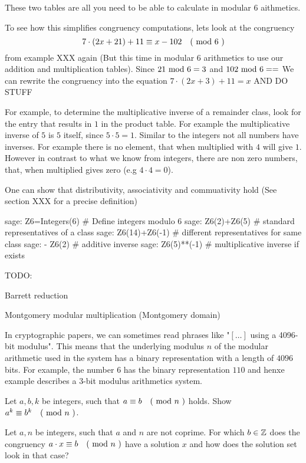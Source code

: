 \begin{example} 
These two tables are all you need to be able to calculate in modular $6$ aithmetics. 

To see how this simplifies congruency computations, lets look at the congruency 
$$7\cdot(2x+21) + 11 \equiv x-102 \quad \text{( mod } 6 \text{ )}$$
from example XXX again (But this time in modular $6$ arithmetics to use our addition and multiplication tables). Since $21 \text{ mod } 6= 3$ and $102 \text{ mod } 6= =$ We can rewrite the congruency into the equation 
$7\cdot(2x+3) + 11=x$
AND DO STUFF



For example, to determine the multiplicative inverse of a remainder class, look for the entry that results in $ 1 $ in the product table. For example the multiplicative inverse of $ 5 $ is $ 5 $ itself, since $5\cdot 5 = 1$. Similar to the integers not all numbers have inverses. For example there is no element, that when multiplied with $4$ will give $1$. 
However in contrast to what we know from integers, there are non zero numbers, that, when multiplied gives zero (e.g $4\cdot 4 =0$).

One can show that distributivity, associativity and commuativity hold (See section XXX for a precise definition)

\begin{sagecommandline}
sage: Z6=Integers(6) # Define integers modulo 6 
sage: Z6(2)+Z6(5) # standard representatives of a class
sage: Z6(14)+Z6(-1) # different representatives for same class
sage: - Z6(2) # additive inverse
sage: Z6(5)**(-1) # multiplicative inverse if exists
\end{sagecommandline}
\end{example}

TODO:

Barrett reduction

Montgomery modular multiplication (Montgomery domain)

\begin{jargon} In cryptographic papers, we can sometimes read phrases like "$[\ldots]$ using a 4096-bit modulus". This means that the underlying modulus $n$ of the modular arithmetic used in the system has a binary representation with a length of $4096$ bits. For example, the number $6$ has the binary representation $110$ and henxe example describes a $3$-bit modulus arithmetics system.   
\end{jargon}
\begin{exercise}
Let $a,b,k$ be integers, such that $a \equiv b \quad \text{( mod } n \text{ )}$ holds. Show $a^k \equiv b^k \quad \text{( mod } n \text{ )}$.
\end{exercise}
\begin{exercise}
Let $a,n$ be integers, such that $a$ and $n$ are not coprime. For which $b\in\mathbb{Z}$ does the 
congruency $a\cdot x \equiv b \quad \text{( mod } n \text{ )}$ have a solution $x$ and how does the solution set look in that case?
\end{exercise}
